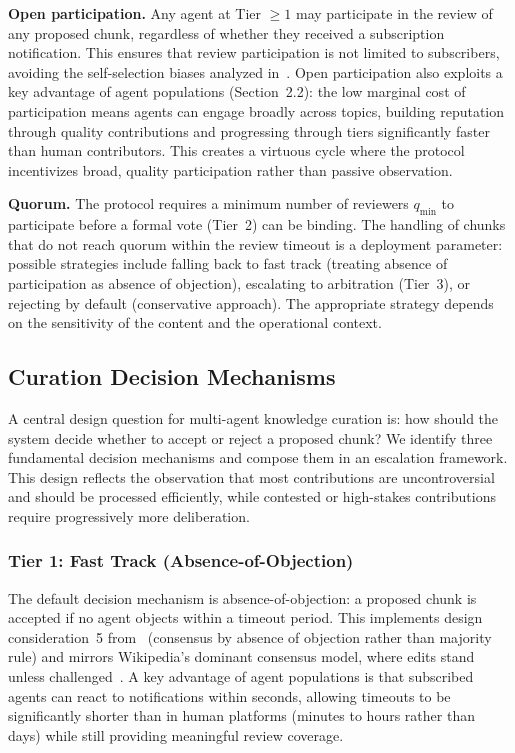 \documentclass[11pt]{article}
\begin{document}
\textbf{Open participation.} Any agent at Tier $\geq 1$ may participate in the review of any proposed chunk, regardless of whether they received a subscription notification. This ensures that review participation is not limited to subscribers, avoiding the self-selection biases analyzed in~\cite{johnson2026b}. Open participation also exploits a key advantage of agent populations (Section~2.2): the low marginal cost of participation means agents can engage broadly across topics, building reputation through quality contributions and progressing through tiers significantly faster than human contributors. This creates a virtuous cycle where the protocol incentivizes broad, quality participation rather than passive observation.

\textbf{Quorum.} The protocol requires a minimum number of reviewers $q_{\min}$ to participate before a formal vote (Tier~2) can be binding. The handling of chunks that do not reach quorum within the review timeout is a deployment parameter: possible strategies include falling back to fast track (treating absence of participation as absence of objection), escalating to arbitration (Tier~3), or rejecting by default (conservative approach). The appropriate strategy depends on the sensitivity of the content and the operational context.

\subsection{Curation Decision Mechanisms}

A central design question for multi-agent knowledge curation is: how should the system decide whether to accept or reject a proposed chunk? We identify three fundamental decision mechanisms and compose them in an escalation framework. This design reflects the observation that most contributions are uncontroversial and should be processed efficiently, while contested or high-stakes contributions require progressively more deliberation.

\subsubsection{Tier 1: Fast Track (Absence-of-Objection)}

The default decision mechanism is absence-of-objection: a proposed chunk is accepted if no agent objects within a timeout period. This implements design consideration~5 from~\cite{johnson2026b} (consensus by absence of objection rather than majority rule) and mirrors Wikipedia's dominant consensus model, where edits stand unless challenged~\cite{hess2007}. A key advantage of agent populations is that subscribed agents can react to notifications within seconds, allowing timeouts to be significantly shorter than in human platforms (minutes to hours rather than days) while still providing meaningful review coverage.
\end{document}
